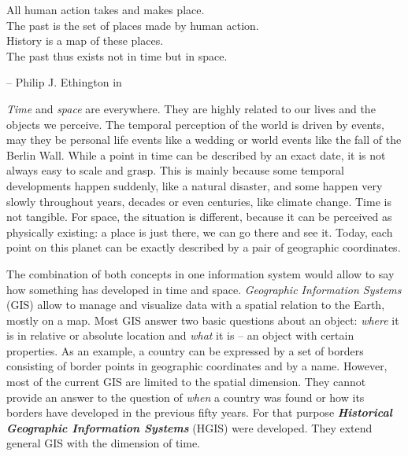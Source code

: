 \begin{quoteit}
  All human action takes and makes place. \\
  The past is the set of places made by human action. \\
  History is a map of these places. \\
  The past thus exists not in time but in space.
\end{quoteit}
\hfill -- Philip J. Ethington in \cite[précis]{citeTakeMakePlace}

\emph{Time} and \emph{space} are everywhere. They are highly related to our lives and the objects we perceive. The temporal perception of the world is driven by events, may they be personal life events like a wedding or world events like the fall of the Berlin Wall. While a point in time can be described by an exact date, it is not always easy to scale and grasp. This is mainly because some temporal developments happen suddenly, like a natural disaster, and some happen very slowly throughout years, decades or even centuries, like climate change. Time is not tangible. For space, the situation is different, because it can be perceived as physically existing: a place is just there, we can go there and see it. Today, each point on this planet can be exactly described by a pair of geographic coordinates.

The combination of both concepts in one information system would allow to say how something has developed in time and space. \emph{Geographic Information Systems} (GIS) allow to manage and visualize data with a spatial relation to the Earth, mostly on a map. Most GIS answer two basic questions about an object: \emph{where} it is in relative or absolute location and \emph{what} it is -- an object with certain properties. As an example, a country can be expressed by a set of borders consisting of border points in geographic coordinates and by a name. However, most of the current GIS are limited to the spatial dimension. They cannot provide an answer to the question of \emph{when} a country was found or how its borders have developed in the previous fifty years. For that purpose \textbf{\emph{Historical Geographic Information Systems}} (HGIS) were developed. They extend general GIS with the dimension of time.

